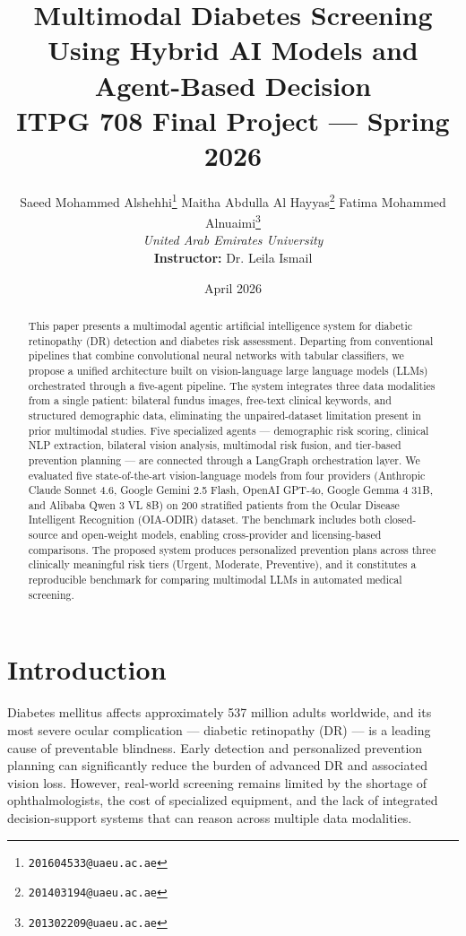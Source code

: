 \documentclass[11pt,a4paper]{article}
\title{
    \vspace{-1.5cm}
    \textbf{Multimodal Diabetes Screening Using Hybrid AI Models and Agent-Based Decision}\\[0.5em]
    \large ITPG 708 Final Project --- Spring 2026
}
\author{
    Saeed Mohammed Alshehhi\thanks{\texttt{201604533@uaeu.ac.ae}} \quad
    Maitha Abdulla Al Hayyas\thanks{\texttt{201403194@uaeu.ac.ae}} \quad
    Fatima Mohammed Alnuaimi\thanks{\texttt{201302209@uaeu.ac.ae}}\\[0.5em]
    \textit{United Arab Emirates University}\\[0.3em]
    \textbf{Instructor:} Dr. Leila Ismail
}
\date{April 2026}
\begin{document}
\maketitle
\thispagestyle{empty}

\begin{abstract}
This paper presents a multimodal agentic artificial intelligence system for diabetic retinopathy (DR) detection and diabetes risk assessment. Departing from conventional pipelines that combine convolutional neural networks with tabular classifiers, we propose a unified architecture built on vision-language large language models (LLMs) orchestrated through a five-agent pipeline. The system integrates three data modalities from a single patient: bilateral fundus images, free-text clinical keywords, and structured demographic data, eliminating the unpaired-dataset limitation present in prior multimodal studies. Five specialized agents --- demographic risk scoring, clinical NLP extraction, bilateral vision analysis, multimodal risk fusion, and tier-based prevention planning --- are connected through a LangGraph orchestration layer. We evaluated five state-of-the-art vision-language models from four providers (Anthropic Claude Sonnet 4.6, Google Gemini 2.5 Flash, OpenAI GPT-4o, Google Gemma 4 31B, and Alibaba Qwen 3 VL 8B) on 200 stratified patients from the Ocular Disease Intelligent Recognition (OIA-ODIR) dataset. The benchmark includes both closed-source and open-weight models, enabling cross-provider and licensing-based comparisons. The proposed system produces personalized prevention plans across three clinically meaningful risk tiers (Urgent, Moderate, Preventive), and it constitutes a reproducible benchmark for comparing multimodal LLMs in automated medical screening.
\end{abstract}

\newpage
\tableofcontents
\newpage

\section{Introduction}

Diabetes mellitus affects approximately 537 million adults worldwide, and its most severe ocular complication --- diabetic retinopathy (DR) --- is a leading cause of preventable blindness. Early detection and personalized prevention planning can significantly reduce the burden of advanced DR and associated vision loss. However, real-world screening remains limited by the shortage of ophthalmologists, the cost of specialized equipment, and the lack of integrated decision-support systems that can reason across multiple data modalities.
\end{document}
